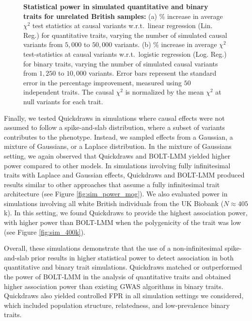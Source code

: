 \begin{figure}[h!]
    \caption{\textbf{Statistical power in simulated quantitative and binary traits for unrelated British samples: }
    (a) \% increase in average $\chi^2$ test statistics at causal variants w.r.t.\ linear regression (Lin. Reg.) for quantitative traits, varying the number of simulated causal variants from $5{,}000$ to $50{,}000$ variants.
    (b) \% increase in average $\chi^2$ test-statistics at causal variants w.r.t.\ logistic regression (Log. Reg.) for binary traits, varying the number of simulated causal variants from $1{,}250$ to $10{,}000$ variants.
    Error bars represent the standard error in the percentage improvement, measured using $50$ independent traits.
    The causal $\chi^2$ is normalized by the mean $\chi^2$ at null variants for each trait.
    } 
    \label{fig:sim_power}
\end{figure}

%
Finally, we tested Quickdraws in simulations where causal effects were not assumed to follow a spike-and-slab distribution, where a subset of variants contributes to the phenotype.
%
Instead, we sampled effects from a Gaussian, a mixture of Gaussians, or a Laplace distribution.
%
In the mixture of Gaussians setting, we again observed that Quickdraws and BOLT-LMM yielded higher power compared to other models.
%
In simulations involving fully infinitesimal traits with Laplace and Gaussian effects, Quickdraws and BOLT-LMM produced results similar to other approaches that assume a fully infinitesimal trait architecture (see Figure \ref{fig:sim_power_mog}).
%
We also evaluated power in simulations involving all white British individuals from the UK Biobank ($N \approx 405$k).
%
In this setting, we found Quickdraws to provide the highest association power, with higher power than BOLT-LMM when the polygenicity of the trait was low (see Figure \ref{fig:sim_400k}).
%
%



Overall, these simulations demonstrate that the use of a non-infinitesimal spike-and-slab prior results in higher statistical power to detect association in both quantitative and binary trait simulations.
%
Quickdraws matched or outperformed the power of BOLT-LMM in the analysis of quantitative traits and obtained higher association power than existing GWAS algorithms in binary traits.
%
Quickdraws also yielded controlled FPR in all simulation settings we considered, which included population structure, relatedness, and low-prevalence binary traits.

